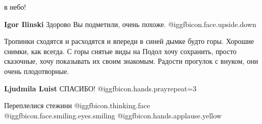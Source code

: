  
 
 
 
 


в небо!

\textbf{Igor Ilinski} Здорово Вы подметили, очень похоже. @igg{fbicon.face.upside.down} 


Тропинки сходятся и расходятся и впереди в синей дымке будто горы. Хорошие
снимки, как всегда. С горы снятые виды на Подол хочу сохранить, просто сказочные,
хочу показывать их своим знакомым. Радости прогулок с внуком, они очень
плодотворные.

\textbf{Ljudmila Luist} СПАСИБО! @igg{fbicon.hands.pray}{repeat=3} 


Переплелися стежини  @igg{fbicon.thinking.face}
@igg{fbicon.face.smiling.eyes.smiling}  @igg{fbicon.hands.applause.yellow} 
